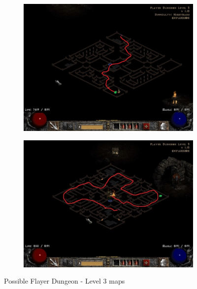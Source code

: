 \begin{figure}
	\medskip
	\begin{subfigure}{0.495\hsize}
		\centering
		\includegraphics[width=\hsize]{Assets/FlayerDungeon3_5}
	\end{subfigure}
	\hfill
	\begin{subfigure}{0.495\hsize}
		\centering
		\includegraphics[width=\hsize]{Assets/FlayerDungeon3_6}
	\end{subfigure}
	\caption{Possible Flayer Dungeon - Level 3 maps\cite{flayerdungeon3maps}}
	\label{Figure:MapsActIIFlayerDungeonLevel3}
\end{figure}
